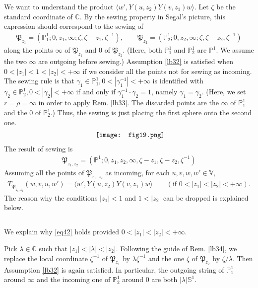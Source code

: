 \documentclass[11pt,b5paper,notitlepage]{article}
\theoremstyle{definition}
\theoremstyle{plain}
\newcommand{\fk}{\mathfrak}
\newcommand{\bk}[1]{\langle {#1}\rangle}
\newcommand{\Vbb}{\mathbb V}
\newcommand{\Cbb}{\mathbb C}
\newcommand{\Pbb}{\mathbb P}
\newcommand{\Sbb}{{\mathbb S}}
\numberwithin{equation}{section}
\begin{document}
We want to understand the product $\bk{w',Y(u,z_2)Y(v,z_1)w}$. Let $\zeta$ be the standard coordinate of $\Cbb$. By the sewing property in Segal's picture, this expression should correspond to the sewing of
\begin{gather*}
\fk P_{z_1}=(\Pbb^1_1;0,z_1,\infty;\zeta,\zeta-z_1,\zeta^{-1}),\qquad \fk P_{z_2}=(\Pbb^1_2;0,z_2,\infty;\zeta,\zeta-z_2,\zeta^{-1})	
\end{gather*}
along the points $\infty$ of $\fk P_{z_1}$ and $0$ of $\fk P_{z_2}$. (Here, both $\Pbb^1_1$ and $\Pbb^1_2$ are $\Pbb^1$. We assume the two $\infty$ are outgoing before sewing.) Assumption \ref{lb32} is satisfied when $0<|z_1|<1<|z_2|<+\infty$ if we consider all the points not for sewing as incoming. The sewing rule is that $\gamma_1\in\Pbb^1_1,0<|\gamma_1^{-1}|<+\infty$ is identified with $\gamma_2\in\Pbb^1_2,0<|\gamma_2|<+\infty$  if and only if  $\gamma_1^{-1}\cdot \gamma_2=1$, namely $\gamma_1=\gamma_2$. (Here, we set $r=\rho=\infty$ in order to apply Rem. \ref{lb33}. The discarded points are the $\infty$ of $\Pbb^1_1$ and the $0$ of $\Pbb^1_2$.) Thus, the sewing is just placing the first sphere onto the second one. 
\begin{align*}
\vcenter{\hbox{{
\texttt{[image: fig19.png]}}}}
\end{align*}
The result of sewing is
\begin{gather}
\fk P_{z_1,z_2}=(\Pbb^1;0,z_1,z_2,\infty,\zeta-z_1,\zeta-z_2,\zeta^{-1})\label{eq61}	
\end{gather}
Assuming all the points of $\fk P_{z_1,z_2}$ as incoming,  for each $u,v,w,w'\in\Vbb$,
\begin{align}
T_{\fk P_{z_1,z_2}}(w,v,u,w')=\bk{w',Y(u,z_2)Y(v,z_1)w}\qquad(\text{if }0<|z_1|<|z_2|<+\infty).\label{eq42}	
\end{align}
The reason why the conditions $|z_1|<1$ and $1<|z_2|$ can be dropped is explained below.



\subsection{}\label{lb185}

We explain why \eqref{eq42} holds provided  $0<|z_1|<|z_2|<+\infty$.

Pick $\lambda\in\Cbb$ such that $|z_1|<|\lambda|<|z_2|$. Following the guide of Rem. \ref{lb34}, we replace the local coordinate $\zeta^{-1}$ of $\fk P_{z_1}$ by $\lambda\zeta^{-1}$ and the one $\zeta$ of $\fk P_{z_2}$ by $\zeta/\lambda$. Then Assumption \ref{lb32} is again satisfied. In particular, the outgoing string of $\Pbb^1_1$ around $\infty$ and the incoming one of $\Pbb^1_2$ around $0$ are both $|\lambda|\Sbb^1$.
\end{document}
